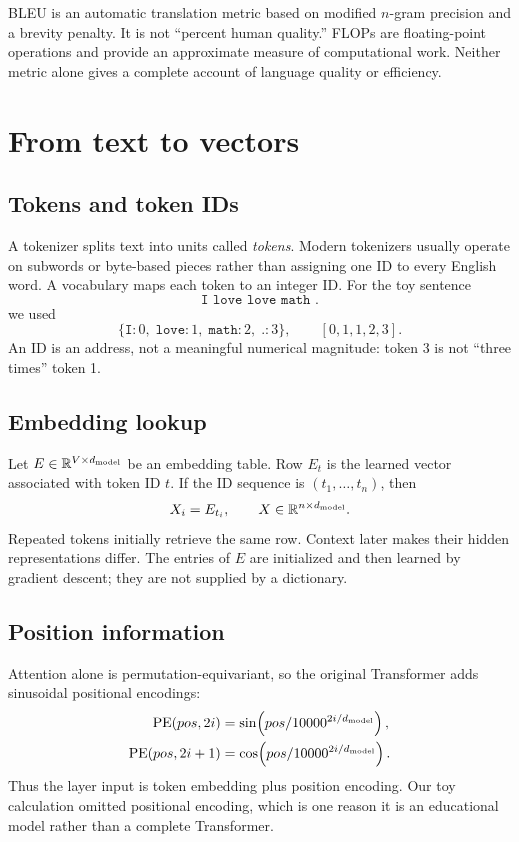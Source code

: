 \documentclass[11pt]{article}
\newcommand{\R}{\mathbb{R}}
\begin{document}
BLEU is an automatic translation metric based on modified $n$-gram precision and a brevity penalty. It is
not ``percent human quality.'' FLOPs are floating-point operations and provide an approximate measure of
computational work. Neither metric alone gives a complete account of language quality or efficiency.

\section{From text to vectors}

\subsection{Tokens and token IDs}

A tokenizer splits text into units called \emph{tokens}. Modern tokenizers usually operate on subwords or
byte-based pieces rather than assigning one ID to every English word. A vocabulary maps each token to an
integer ID. For the toy sentence
\[
  \texttt{I love love math .}
\]
we used
\[
\{\texttt{I}:0,\;\texttt{love}:1,\;\texttt{math}:2,\;\texttt{.}:3\},
\qquad [0,1,1,2,3].
\]
An ID is an address, not a meaningful numerical magnitude: token 3 is not ``three times'' token 1.

\subsection{Embedding lookup}

Let $E\in\R^{V\times d_{\rm model}}$ be an embedding table. Row $E_t$ is the learned vector associated
with token ID $t$. If the ID sequence is $(t_1,\ldots,t_n)$, then
\[
  X_i=E_{t_i},\qquad X\in\R^{n\times d_{\rm model}}.
\]
Repeated tokens initially retrieve the same row. Context later makes their hidden representations differ.
The entries of $E$ are initialized and then learned by gradient descent; they are not supplied by a dictionary.

\subsection{Position information}

Attention alone is permutation-equivariant, so the original Transformer adds sinusoidal positional encodings:
\begin{align}
  \mathrm{PE}(pos,2i)&=\sin\!\left(pos/10000^{2i/d_{\rm model}}\right),\\
  \mathrm{PE}(pos,2i+1)&=\cos\!\left(pos/10000^{2i/d_{\rm model}}\right).
\end{align}
Thus the layer input is token embedding plus position encoding. Our toy calculation omitted positional
encoding, which is one reason it is an educational model rather than a complete Transformer.
\end{document}
